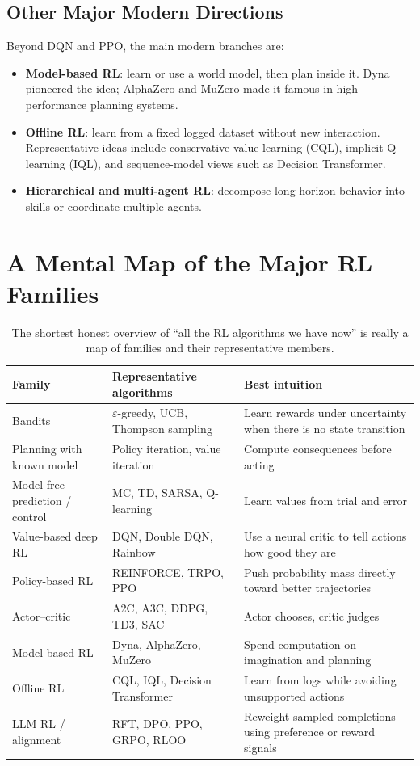 \documentclass[11pt]{article}
\begin{document}
  \subsection{Other Major Modern Directions}

  Beyond DQN and PPO, the main modern branches are:

  \begin{itemize}
    \item \textbf{Model-based RL}: learn or use a world model, then plan inside it. Dyna pioneered the idea; AlphaZero and MuZero made it famous in high-performance planning systems.
    \item \textbf{Offline RL}: learn from a fixed logged dataset without new interaction. Representative ideas include conservative value learning (CQL), implicit Q-learning (IQL), and sequence-model views such as Decision Transformer.
    \item \textbf{Hierarchical and multi-agent RL}: decompose long-horizon behavior into skills or coordinate multiple agents.
  \end{itemize}

  \section{A Mental Map of the Major RL Families}

  \begin{table}[t]
  \centering
  \small
  \begin{tabularx}{\linewidth}{@{}lYY@{}}
  \toprule
  Family & Representative algorithms & Best intuition \\
  \midrule
  Bandits & $\varepsilon$-greedy, UCB, Thompson sampling & Learn rewards under uncertainty when there is no state transition \\
  Planning with known model & Policy iteration, value iteration & Compute consequences before acting \\
  Model-free prediction / control & MC, TD, SARSA, Q-learning & Learn values from trial and error \\
  Value-based deep RL & DQN, Double DQN, Rainbow & Use a neural critic to tell actions how good they are \\
  Policy-based RL & REINFORCE, TRPO, PPO & Push probability mass directly toward better trajectories \\
  Actor--critic & A2C, A3C, DDPG, TD3, SAC & Actor chooses, critic judges \\
  Model-based RL & Dyna, AlphaZero, MuZero & Spend computation on imagination and planning \\
  Offline RL & CQL, IQL, Decision Transformer & Learn from logs while avoiding unsupported actions \\
  LLM RL / alignment & RFT, DPO, PPO, GRPO, RLOO & Reweight sampled completions using preference or reward signals \\
  \bottomrule
  \end{tabularx}
  \caption{The shortest honest overview of ``all the RL algorithms we have now'' is really a map of families and their representative members.}
  \end{table}
\end{document}
